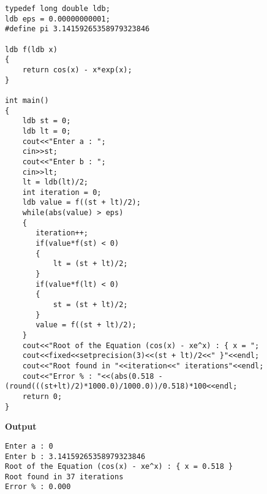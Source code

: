 \documentclass{article}
\begin{document}
\begin{enumerate}
{\begin{verbatim}
typedef long double ldb;
ldb eps = 0.00000000001;
#define pi 3.14159265358979323846

ldb f(ldb x)
{
    return cos(x) - x*exp(x);
}

int main()
{
    ldb st = 0;
    ldb lt = 0;
    cout<<"Enter a : ";
    cin>>st;
    cout<<"Enter b : ";
    cin>>lt;
    lt = ldb(lt)/2;
    int iteration = 0;
    ldb value = f((st + lt)/2);
    while(abs(value) > eps)
    {
       iteration++;
       if(value*f(st) < 0)
       {
           lt = (st + lt)/2; 
       }
       if(value*f(lt) < 0)
       {
           st = (st + lt)/2; 
       }
       value = f((st + lt)/2);
    }
    cout<<"Root of the Equation (cos(x) - xe^x) : { x = ";
    cout<<fixed<<setprecision(3)<<(st + lt)/2<<" }"<<endl;
    cout<<"Root found in "<<iteration<<" iterations"<<endl;
    cout<<"Error % : "<<(abs(0.518 - (round(((st+lt)/2)*1000.0)/1000.0))/0.518)*100<<endl;
    return 0;
}
\end{verbatim}
\textbf{Output}
\begin{verbatim}
Enter a : 0
Enter b : 3.14159265358979323846
Root of the Equation (cos(x) - xe^x) : { x = 0.518 }
Root found in 37 iterations
Error % : 0.000
\end{verbatim}
}
\end{enumerate}
\end{document}
